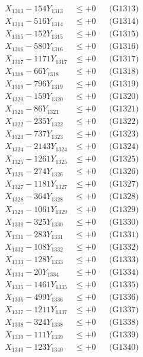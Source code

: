 \documentclass[a4paper,10pt]{article}
\begin{document}
{\begin{align}
X_{1313} - 154Y_{1313} &\leq +0 && \text{(G1313)} \\
X_{1314} - 516Y_{1314} &\leq +0 && \text{(G1314)} \\
X_{1315} - 152Y_{1315} &\leq +0 && \text{(G1315)} \\
X_{1316} - 580Y_{1316} &\leq +0 && \text{(G1316)} \\
X_{1317} - 1171Y_{1317} &\leq +0 && \text{(G1317)} \\
X_{1318} - 66Y_{1318} &\leq +0 && \text{(G1318)} \\
X_{1319} - 796Y_{1319} &\leq +0 && \text{(G1319)} \\
X_{1320} - 159Y_{1320} &\leq +0 && \text{(G1320)} \\
\allowbreak
X_{1321} - 86Y_{1321} &\leq +0 && \text{(G1321)} \\
X_{1322} - 235Y_{1322} &\leq +0 && \text{(G1322)} \\
X_{1323} - 737Y_{1323} &\leq +0 && \text{(G1323)} \\
X_{1324} - 2143Y_{1324} &\leq +0 && \text{(G1324)} \\
X_{1325} - 1261Y_{1325} &\leq +0 && \text{(G1325)} \\
X_{1326} - 274Y_{1326} &\leq +0 && \text{(G1326)} \\
X_{1327} - 1181Y_{1327} &\leq +0 && \text{(G1327)} \\
X_{1328} - 364Y_{1328} &\leq +0 && \text{(G1328)} \\
X_{1329} - 1061Y_{1329} &\leq +0 && \text{(G1329)} \\
X_{1330} - 325Y_{1330} &\leq +0 && \text{(G1330)} \\
\allowbreak
X_{1331} - 283Y_{1331} &\leq +0 && \text{(G1331)} \\
X_{1332} - 108Y_{1332} &\leq +0 && \text{(G1332)} \\
X_{1333} - 128Y_{1333} &\leq +0 && \text{(G1333)} \\
X_{1334} - 20Y_{1334} &\leq +0 && \text{(G1334)} \\
X_{1335} - 1461Y_{1335} &\leq +0 && \text{(G1335)} \\
X_{1336} - 499Y_{1336} &\leq +0 && \text{(G1336)} \\
X_{1337} - 1211Y_{1337} &\leq +0 && \text{(G1337)} \\
X_{1338} - 324Y_{1338} &\leq +0 && \text{(G1338)} \\
X_{1339} - 111Y_{1339} &\leq +0 && \text{(G1339)} \\
X_{1340} - 123Y_{1340} &\leq +0 && \text{(G1340)} \\

\end{align}}
\end{document}
